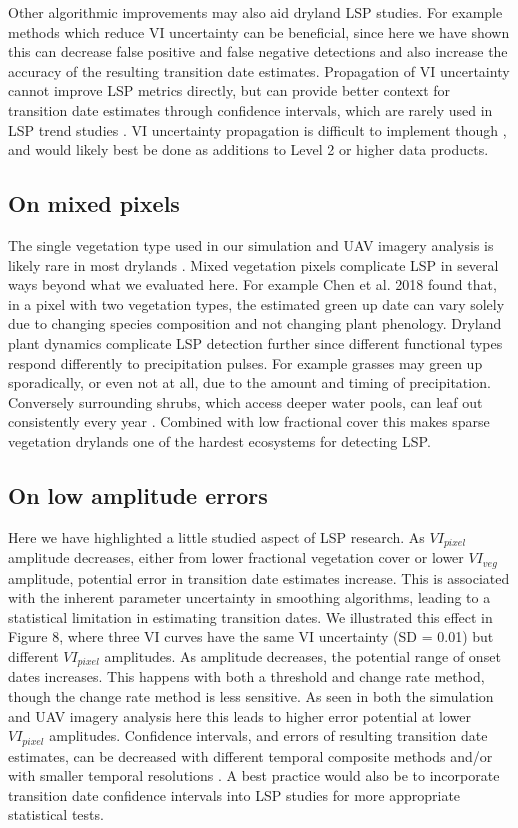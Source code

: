 \documentclass{article}
\begin{document}
Other algorithmic improvements may also aid dryland LSP studies. For example methods which reduce VI uncertainty can be beneficial, since here we have shown this can decrease false positive and false negative detections and also increase the accuracy of the resulting transition date estimates. Propagation of VI uncertainty cannot improve LSP metrics directly, but can provide better context for transition date estimates through confidence intervals, which are rarely used in LSP trend studies \cite{cortes2021}. VI uncertainty propagation is difficult to implement though \cite{borgogno-mondino2016}, and would likely best be done as additions to Level 2 or higher data products. 

\subsection{On mixed pixels}

The single vegetation type used in our simulation and UAV imagery analysis is likely rare in most drylands \cite{jones2018}. Mixed vegetation pixels complicate LSP in several ways beyond what we evaluated here. For example Chen et al. 2018 \cite{chen-wang2018} found that, in a pixel with two vegetation types, the estimated green up date can vary solely due to changing species composition and not changing plant phenology. Dryland plant dynamics complicate LSP detection further since different functional types respond differently to precipitation pulses. For example grasses may green up sporadically, or even not at all, due to the amount and timing of precipitation. Conversely surrounding shrubs, which access deeper water pools, can leaf out consistently every year \cite{ogle2004, lauenroth2014, moreno2015}. Combined with low fractional cover this makes sparse vegetation drylands one of the hardest ecosystems for detecting LSP.

\subsection{On low amplitude errors}
Here we have highlighted a little studied aspect of LSP research. As $VI_{pixel}$ amplitude decreases, either from lower fractional vegetation cover or lower $VI_{veg}$ amplitude, potential error in transition date estimates increase. This is associated with the inherent parameter uncertainty in smoothing algorithms, leading to a statistical limitation in estimating transition dates. We illustrated this effect in Figure 8, where three VI curves have the same VI uncertainty (SD = 0.01) but different $VI_{pixel}$ amplitudes. As amplitude decreases, the potential range of onset dates increases. This happens with both a threshold and change rate method, though the change rate method is less sensitive. As seen in both the simulation and UAV imagery analysis here this leads to higher error potential at lower $VI_{pixel}$ amplitudes. Confidence intervals, and errors of resulting transition date estimates, can be decreased with different temporal composite methods and/or with smaller temporal resolutions \cite{zhang-friedl2009}. A best practice would also be to incorporate transition date confidence intervals into LSP studies for more appropriate statistical tests.
\end{document}

